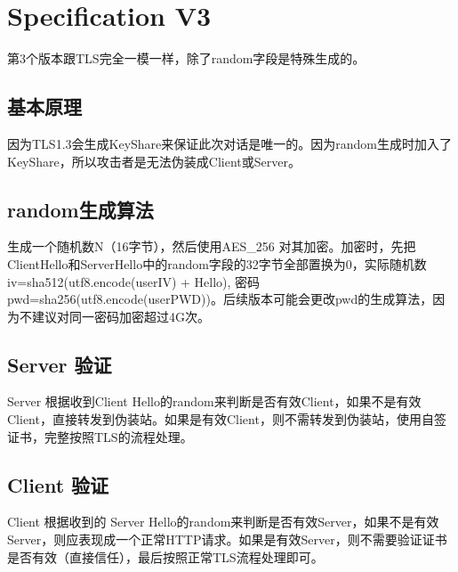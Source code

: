 \chapter{Specification V3}
第3个版本跟TLS完全一模一样，除了random字段是特殊生成的。

\section{基本原理}
因为TLS1.3会生成KeyShare来保证此次对话是唯一的。因为random生成时加入了KeyShare，所以攻击者是无法伪装成Client或Server。

\section{random生成算法}
生成一个随机数N（16字节），然后使用AES\_256 对其加密。加密时，先把ClientHello和ServerHello中的random字段的32字节全部置换为0，实际随机数iv=sha512(utf8.encode(userIV) + Hello), 密码pwd=sha256(utf8.encode(userPWD))。后续版本可能会更改pwd的生成算法，因为不建议对同一密码加密超过4G次。

\section{Server 验证}
Server 根据收到Client Hello的random来判断是否有效Client，如果不是有效Client，直接转发到伪装站。如果是有效Client，则不需转发到伪装站，使用自签证书，完整按照TLS的流程处理。

\section{Client 验证}
Client 根据收到的 Server Hello的random来判断是否有效Server，如果不是有效Server，则应表现成一个正常HTTP请求。如果是有效Server，则不需要验证证书是否有效（直接信任），最后按照正常TLS流程处理即可。
